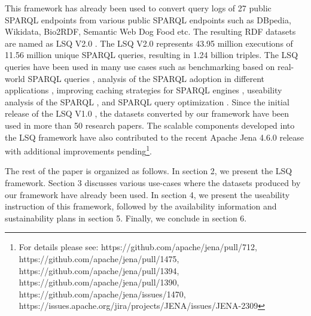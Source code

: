 This framework has already been used to convert query
logs of 27 public SPARQL endpoints from various public SPARQL endpoints such as DBpedia, Wikidata, Bio2RDF, Semantic Web Dog Food etc. The resulting RDF datasets are named as LSQ V2.0 \cite{stadleralsq}. The LSQ V2.0 represents 43.95 million executions of 11.56 million unique SPARQL queries, resulting in 1.24 billion triples.  
The LSQ queries have been used in many use cases such as benchmarking based on real-world SPARQL queries \cite{SaleemMN15,SaleemMSLN18,saleem2018largerdfbench,SaleemSCBMN19,hernandez2016querying,fernandez2019evaluating,azzam2020smart,bigerl2020tentris,AzzamAMKPH21,davoudian2021workload,9364498,9364380}, analysis of the SPARQL adoption in different applications \cite{han2016statistical,BonifatiMT17,bonifati2018darql}, improving caching strategies for SPARQL engines \cite{knuth2016scheduling,akhtar2018change,akhtar2019dynamic,SalasH18,safavi2019personalized}, useability analysis of the SPARQL \cite{arenas2016reverse,benedetti2016model,dellal2017addressing,stegemann2017investigating,Viswanathan18,Potoniec19,wang2019answering,BonifatiMT20,jian2020sparql,zhang2020revealing,ALMENDROSJIMENEZ2021113772,wang2021explaining}, and SPARQL query optimization \cite{song2016efficient,MartensT18,cheng2019opt+,FigueiraGKMNT20}. Since the initial release of the LSQ V1.0 \cite{SaleemAHMN15}, the datasets converted by our framework have been used in more than 50 research papers\cite{stadleralsq}. The scalable components developed into the LSQ framework have also contributed to the recent Apache Jena 4.6.0 release with additional improvements pending\footnote{For details please see: https://github.com/apache/jena/pull/712, 
https://github.com/apache/jena/pull/1475,
https://github.com/apache/jena/pull/1394, 
https://github.com/apache/jena/pull/1390, 
https://github.com/apache/jena/issues/1470, https://issues.apache.org/jira/projects/JENA/issues/JENA-2309}. 

The rest of the paper is organized as follows. In section 2, we present the LSQ framework. Section 3 discusses various use-cases where the datasets produced by our framework have already been used. In section 4, we present the useability instruction of this framework, followed by the availability information and sustainability plans in section 5. Finally, we conclude in section 6. 

